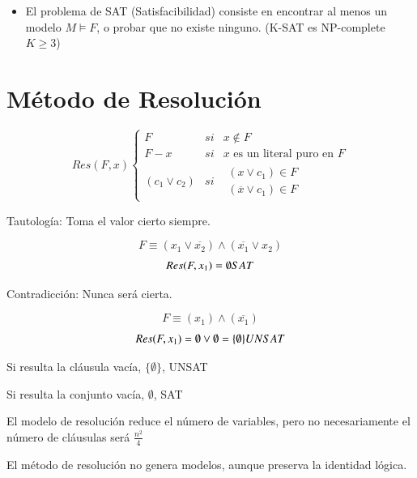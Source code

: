 \documentclass[12pt, twoside, openright]{report} %
\begin{document}
  \begin{itemize}

  \item
    El problema de SAT (Satisfacibilidad) consiste en encontrar al menos
    un modelo \(M \models F\), o probar que no existe ninguno. (K-SAT es
    NP-complete \(K \geq 3\))
  \end{itemize}
  \vspace{-0.5cm}
\section{Método de Resolución}
\vspace{-0.5cm}
    $$Res(F,x)\left\{\begin{matrix}  
		F &si&x\notin F \\  
		F-x &si& x \text{ es un literal puro en } F \\  
		(c_1 \vee c_2) &si& \begin{matrix}  (x \vee c_1) \in F\\  
		(\overline{x} \vee c_1) \in F  \end{matrix}  \end{matrix}\right.$$

	Tautología: Toma el valor cierto siempre.
	\vspace{-0.5cm}

    
	$$F \equiv (x_1 \vee \overline{x_2})\wedge (\overline{x_1} \vee x_2)$$
	$$Res(F,x_1)= \emptyset \space SAT$$

	Contradicción: Nunca será cierta.
	\vspace{-0.5cm}

	$$F \equiv (x_1)\wedge (\overline{x_1})$$
	$$Res(F,x_1)= \emptyset \vee \emptyset = \{ \emptyset \} \space UNSAT$$

	  
	Si resulta la cláusula vacía, \(\{ \emptyset \}\), UNSAT

	
  Si resulta la conjunto vacía, \(\emptyset\), SAT

	El modelo de resolución reduce el número de variables, pero no
    necesariamente el número de cláusulas será \(\frac {n^2} {4}\)

	
  El método de resolución no genera modelos, aunque preserva la
  identidad lógica.
\end{document}
